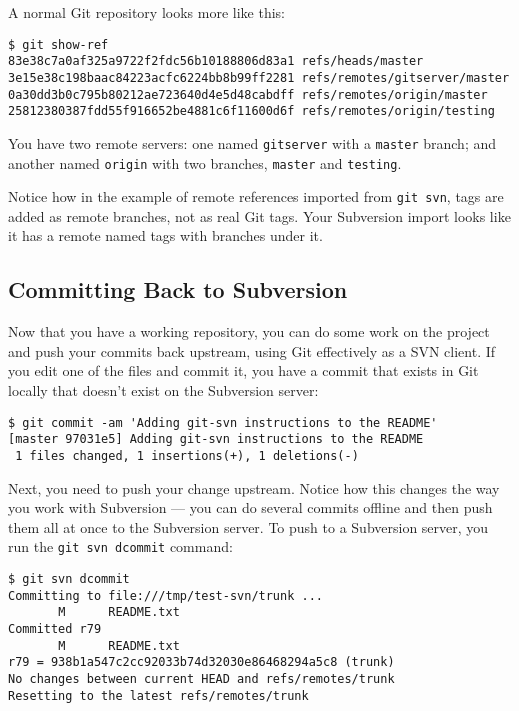\documentclass[a4paper]{book}
\begin{document}
A normal Git repository looks more like this:

\begin{shaded}\begin{verbatim}
$ git show-ref
83e38c7a0af325a9722f2fdc56b10188806d83a1 refs/heads/master
3e15e38c198baac84223acfc6224bb8b99ff2281 refs/remotes/gitserver/master
0a30dd3b0c795b80212ae723640d4e5d48cabdff refs/remotes/origin/master
25812380387fdd55f916652be4881c6f11600d6f refs/remotes/origin/testing
\end{verbatim}\end{shaded}

You have two remote servers: one named \texttt{gitserver} with a \texttt{master} branch; and another named \texttt{origin} with two branches, \texttt{master} and \texttt{testing}.

Notice how in the example of remote references imported from \texttt{git svn}, tags are added as remote branches, not as real Git tags. Your Subversion import looks like it has a remote named tags with branches under it.

\subsection{Committing Back to Subversion}

Now that you have a working repository, you can do some work on the project and push your commits back upstream, using Git effectively as a SVN client. If you edit one of the files and commit it, you have a commit that exists in Git locally that doesn't exist on the Subversion server:

\begin{shaded}\begin{verbatim}
$ git commit -am 'Adding git-svn instructions to the README'
[master 97031e5] Adding git-svn instructions to the README
 1 files changed, 1 insertions(+), 1 deletions(-)
\end{verbatim}\end{shaded}

Next, you need to push your change upstream. Notice how this changes the way you work with Subversion --- you can do several commits offline and then push them all at once to the Subversion server. To push to a Subversion server, you run the \texttt{git svn dcommit} command:

\begin{shaded}\begin{verbatim}
$ git svn dcommit
Committing to file:///tmp/test-svn/trunk ...
       M      README.txt
Committed r79
       M      README.txt
r79 = 938b1a547c2cc92033b74d32030e86468294a5c8 (trunk)
No changes between current HEAD and refs/remotes/trunk
Resetting to the latest refs/remotes/trunk
\end{verbatim}\end{shaded}
\end{document}
